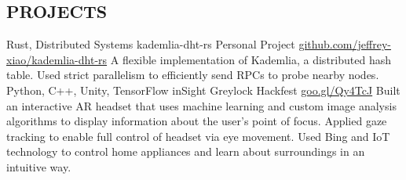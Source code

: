 \documentclass{resume}
\begin{document}
\begin{main}
    \section{PROJECTS}
      \begin{entrylist}
        \rightentry%
          {Rust, Distributed Systems}%
          {kademlia-dht-rs}%
          {Personal Project}%
          {\href{https://github.com/jeffrey-xiao/kademlia-dht-rs}{github.com/jeffrey-xiao/kademlia-dht-rs}}%
          {\createlist%
            {%
              A flexible implementation of Kademlia, a distributed hash table. %
            }%
            {%
              Used strict parallelism to efficiently send RPCs to probe nearby nodes. %
            }%
          }
        \rightentry%
          {Python, C++, Unity, TensorFlow}%
          {inSight}%
          {Greylock Hackfest}%
          {\href{https://goo.gl/Qy4TcJ}{goo.gl/Qy4TcJ}}%
          {\createlist%
            {%
              Built an interactive AR headset that uses machine learning and custom image %
              analysis algorithms to display information about the user's point of focus. %
            }%
            {%
              Applied gaze tracking to enable full control of headset via eye movement. %
            }%
            {%
              Used Bing and IoT technology to control home appliances and learn about surroundings %
              in an intuitive way. %
            }%
          }
      \end{entrylist}
  \end{main}
\end{document}
